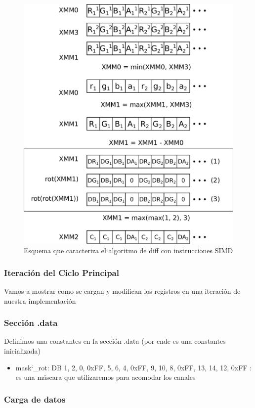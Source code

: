 \begin{figure}
  \centering
  \includegraphics[width=0.7\columnwidth]{esquema_diff.pdf}
  \caption{Esquema que caracteriza el algoritmo de diff con
    instrucciones {\ttfamily SIMD}}
  \label{fig:esquema_diff}
\end{figure}


\subsubsection{Iteración del Ciclo Principal}

Vamos a mostrar como se cargan y modifican los registros en una iteración de nuestra implementación

\subsubsection{Sección .data}

\indent Definimos una constantes en la sección .data (por ende es una constantes inicializada) 
\begin{itemize}

\item mask\char`_rot: DB 1, 2, 0, 0xFF, 5, 6, 4, 0xFF, 9, 10, 8, 0xFF, 13, 14, 12, 0xFF : es una máscara que utilizaremos para acomodar los canales

\end{itemize}


\subsubsection{Carga de datos}


